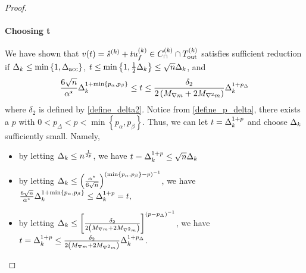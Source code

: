 \begin{proof}
\paragraph*{Choosing t}

We have shown that $v(t) = {{\hat s}^{(k)}}  + t {u^{(k)}_f} \in {C^{(k)}_{\cap}} \cap {T_{\text{out}}^{(k)}}$ satisfies sufficient reduction 
if $\Delta_k \le \min\left\{1, {\Delta_{\textrm{acc}}}\right\}$, $t \le \min\left\{1, \frac 1 2 \Delta_k\right\} \le \sqrt{n} \Delta_k$, and
\begin{align*}
\frac{6 \sqrt{n}}{{ \alpha^{\star} }} \Delta_k^{1 + \min\left\{p_{\alpha}, p_{\beta}\right\}} \le t 
\le \frac {\delta_2}{2\left({M_{\nabla m}} + 2{M_{\nabla^2 m}}\right)} \Delta_k^{1 + p_{\Delta}}
\end{align*}
where $\delta_2$ is defined by \cref{define_delta2}.
Notice from \cref{define_p_delta}, there exists a $p$ with $0 < p_{\Delta} < p < \min\left\{p_{\alpha}, p_{\beta}\right\}$.
Thus, we can let $t = \Delta_k^{1+p}$ and choose $\Delta_k$ sufficiently small.
Namely,
\begin{itemize}
\item by letting 
$\Delta_k \le n^{\frac 1 {2p} }$, we have
$t = \Delta_k^{1+p} \le \sqrt{n} \Delta_k$
\item by letting 
$\Delta_k \le \left(\frac{{ \alpha^{\star} }}{6 \sqrt{n}}\right)^{\left(\min\left\{p_{\alpha}, p_{\beta}\right\} - p\right)^{-1}}$, we have
$\frac{6 \sqrt{n}}{{ \alpha^{\star} }} \Delta_k^{1 + \min\left\{p_{\alpha}, p_{\beta}\right\}} \le \Delta_k^{1+p} = t,$
\item by letting 
$\Delta_k \le \left[ \frac {\delta_2}{2\left({M_{\nabla m}} + 2{M_{\nabla^2 m}}\right)} \right]^{\left(p - p_{\Delta}\right)^{-1}}$, we have
$t = \Delta_k^{1+p} \le  \frac {\delta_2}{2\left({M_{\nabla m}} + 2{M_{\nabla^2 m}}\right)} \Delta_k^{1 + p_{\Delta}}$.
\end{itemize}





\end{proof}
